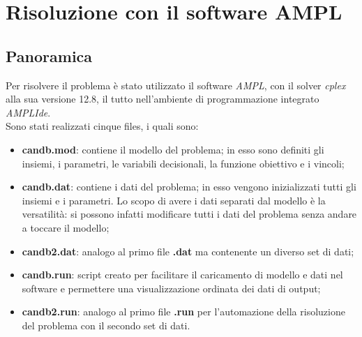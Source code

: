 \newpage
\section{Risoluzione con il software AMPL}
\subsection{Panoramica}
Per risolvere il problema è stato utilizzato il software \textit{AMPL}, con il solver \textit{cplex} alla sua versione 12.8, il tutto nell'ambiente di programmazione integrato \textit{AMPLIde}. \\
Sono stati realizzati cinque files, i quali sono:
\begin{itemize} 
\item \textbf{candb.mod}: contiene il modello del problema; in esso sono definiti gli insiemi, i parametri, le variabili decisionali, la funzione obiettivo e i vincoli;
\item \textbf{candb.dat}: contiene i dati del problema; in esso vengono inizializzati tutti gli insiemi e i parametri. Lo scopo di avere i dati separati dal modello è la versatilità: si possono infatti modificare tutti i dati del problema senza andare a toccare il modello;
\item \textbf{candb2.dat}: analogo al primo file \textbf{.dat} ma contenente un diverso set di dati;
\item \textbf{candb.run}: script creato per facilitare il caricamento di modello e dati nel software e permettere una visualizzazione ordinata dei dati di output;
\item \textbf{candb2.run}: analogo al primo file \textbf{.run} per l'automazione della risoluzione del problema con il secondo set di dati.
\end{itemize}


